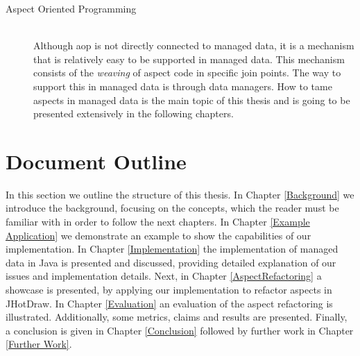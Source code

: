 \begin{description}
  \item[Aspect Oriented Programming]~\\
  Although \ac{aop} is not directly connected to managed data, it is a mechanism that is relatively easy to be supported in managed data.
  This mechanism consists of the \textit{weaving} of aspect code in specific join points. 
  The way to support this in managed data is through data managers. 
  How to tame aspects in managed data is the main topic of this thesis and is going to be presented extensively in the following chapters.

\end{description}

\section{Document Outline}\label{Document Outline}
In this section we outline the structure of this thesis. 
In Chapter \ref{Background} we introduce the background, focusing on the concepts, which the reader must be familiar with in order to follow the next chapters.
In Chapter \ref{Example Application} we demonstrate an example to show the capabilities of our implementation.
In Chapter \ref{Implementation} the implementation of managed data in Java is presented and discussed, providing detailed explanation of our issues and implementation details.
Next, in Chapter \ref{AspectRefactoring} a showcase is presented, by applying our implementation to refactor aspects in JHotDraw.
In Chapter \ref{Evaluation} an evaluation of the aspect refactoring is illustrated.
Additionally, some metrics, claims and results are presented.
Finally, a conclusion is given in Chapter \ref{Conclusion} followed by further work in Chapter \ref{Further Work}.


